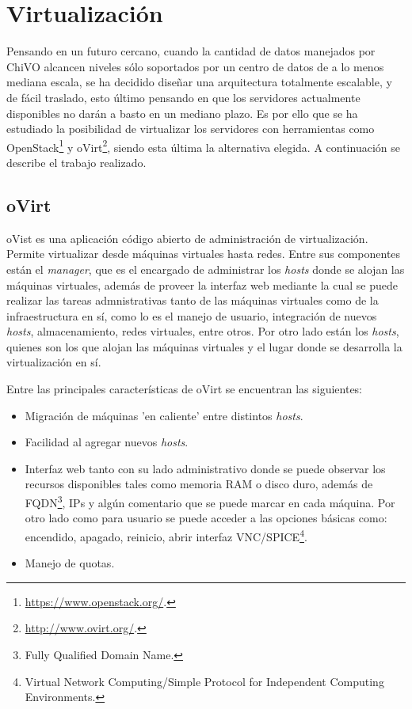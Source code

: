 \section{Virtualización}\label{anx:virtualizacion}

Pensando en un futuro cercano, cuando la cantidad de datos manejados por ChiVO alcancen niveles sólo soportados por un centro de datos de a lo menos mediana escala, se ha decidido diseñar una arquitectura totalmente escalable, y de fácil traslado, esto último pensando en que los servidores actualmente disponibles no darán a basto en un mediano plazo. Es por ello que se ha estudiado la posibilidad de virtualizar los servidores con herramientas como OpenStack\footnote{\url{https://www.openstack.org/}.} y oVirt\footnote{\url{http://www.ovirt.org/}.}, siendo esta última la alternativa elegida. A continuación se describe el trabajo realizado.

\subsection*{oVirt}

oVist es una aplicación código abierto de administración de virtualización. Permite virtualizar desde máquinas virtuales hasta redes. Entre sus componentes están el \emph{manager}, que es el encargado de administrar los \emph{hosts} donde se alojan las máquinas virtuales, además de proveer la interfaz web mediante la cual se puede realizar las tareas admnistrativas tanto de las máquinas virtuales como de la infraestructura en sí, como lo es el manejo de usuario, integración de nuevos \emph{hosts}, almacenamiento, redes virtuales, entre otros. Por otro lado están los \emph{hosts}, quienes son los que alojan las máquinas virtuales y el lugar donde se desarrolla la virtualización en sí.

Entre las principales características de oVirt se encuentran las siguientes:

\begin{itemize}
	\item Migración de máquinas 'en caliente’ entre distintos \emph{hosts}.
	\item Facilidad al agregar nuevos \emph{hosts}.
	\item Interfaz web tanto con su lado administrativo donde se puede observar los recursos disponibles tales como memoria RAM o disco duro, además de FQDN\footnote{Fully Qualified Domain Name.}, IPs y algún comentario que se puede marcar en cada máquina. Por otro lado como para usuario se puede acceder a las opciones básicas como: encendido, apagado, reinicio, abrir interfaz VNC/SPICE\footnote{Virtual Network Computing/Simple Protocol for Independent Computing Environments.}.
	\item Manejo de quotas.
\end{itemize}


